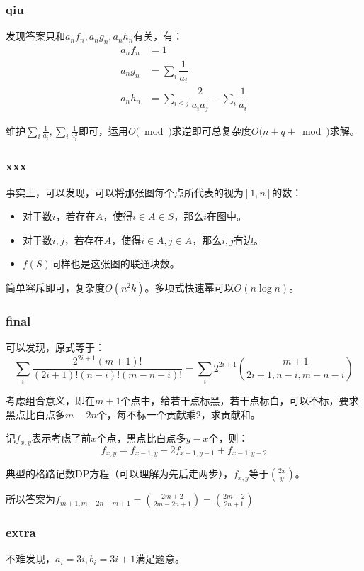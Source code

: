 \documentclass[10pt]{beamer}
\begin{document}
	\clearpage
	\begin{frame}
		\frametitle{qiu}
	
		 发现答案只和$a_nf_n,a_ng_n,a_nh_n$有关，有：
		$$
		\begin{aligned}
			a_nf_n&=1\\
			a_ng_n&=\sum_i \dfrac{1}{a_i}\\
			a_nh_n&=\sum_{i\le j}\dfrac{2}{a_ia_j}-\sum_{i} \dfrac{1}{a_i}
		\end{aligned}
		$$

		 维护$\sum_i\frac{1}{a_i},\sum_i\frac{1}{a_i^2}$即可，运用$O(\bmod)$求逆即可总复杂度$O(n+q+\bmod)$求解。
	
	\end{frame}
	\clearpage
	\begin{frame}
		\frametitle{xxx}
	
		 事实上，可以发现，可以将那张图每个点所代表的视为$[1,n]$的数：
		\begin{itemize}
			\item 对于数$i$，若存在$A$，使得$i\in A\in S$，那么$i$在图中。
			\item 对于数$i,j$，若存在$A$，使得$i\in A,j\in A$，那么$i,j$有边。
			\item $f(S)$同样也是这张图的联通块数。
		\end{itemize}
		
		 简单容斥即可，复杂度$O(n^2k)$。{\color{gray}多项式快速幂可以$O(n\log n)$}。
	\end{frame}
	\clearpage
	\begin{frame}
		\frametitle{final}
		可以发现，原式等于：
		$$
		\sum_i\dfrac{2^{2i+1}(m+1)!}{(2i+1)!(n-i)!(m-n-i)!}=\sum_i 2^{2i+1}{m+1\choose 2i+1,n-i,m-n-i}
		$$
		
		考虑组合意义，即在$m+1$个点中，给若干点标黑，若干点标白，可以不标，要求黑点比白点多$m-2n$个，每不标一个贡献乘$2$，求贡献和。
		
		记$f_{x,y}$表示考虑了前$x$个点，黑点比白点多$y-x$个，则：
		$$
		f_{x,y}=f_{x-1,y}+2f_{x-1,y-1}+f_{x-1,y-2}
		$$
		
		典型的格路记数DP方程（可以理解为先后走两步），$f_{x,y}$等于${2x\choose y}$。
		
		所以答案为$f_{m+1,m-2n+m+1}={2m+2\choose 2m-2n+1}={2m+2\choose 2n+1}$		
	\end{frame}
	\clearpage
	\begin{frame}
		\frametitle{extra}
		不难发现，$a_i=3i,b_i=3i+1$满足题意。
	\end{frame}
	\clearpage
\end{document}
